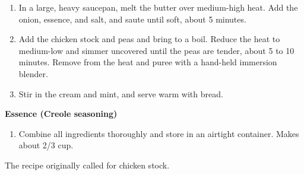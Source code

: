 
\begin{ingredients}
\end{ingredients}


\begin{recipe}
  \begin{enumerate}

  \item In a large, heavy saucepan, melt the butter over medium-high
    heat. Add the onion, essence, and salt, and saute until soft,
    about 5 minutes.

  \item Add the chicken stock and peas and bring to a boil. Reduce the
    heat to medium-low and simmer uncovered until the peas are tender,
    about 5 to 10 minutes. Remove from the heat and puree with a
    hand-held immersion blender.

  \item Stir in the cream and mint, and serve warm with bread.

  \end{enumerate}
\end{recipe}

\textbf{Essence (Creole seasoning)}


\begin{ingredients}
\end{ingredients}


\begin{recipe}
  \begin{enumerate}

  \item Combine all ingredients thoroughly and store in an airtight
    container.  Makes about 2/3 cup.

  \end{enumerate}
\end{recipe}


The recipe originally called for chicken stock.

